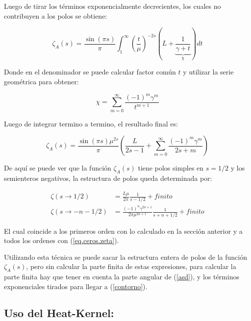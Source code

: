 	Luego de tirar los términos exponencialmente decrecientes, los cuales no contribuyen a los polos se obtiene:

\begin{equation}
	\zeta _A (s) = 
    \frac{ \sin (\pi s)}{ \pi } 
    \int _1 ^{\infty} 
    \left( \frac{t}{\mu}  \right)^{-2s}
    \left(
    	L + 
	    \underbrace
    	{
		\frac{1}{\gamma + t}   
		} _{\chi} 
	\right)
    dt 
\label{contorno}
\end{equation}

Donde en el denominador se puede calcular factor común $t$ y utilizar la serie geométrica para obtener:

\begin{equation}
    \chi =   \sum _{m=0} ^{\infty} \frac{(-1) ^{m} \gamma ^{m} }{t ^{m+1}}
\label{eq:chi}
\end{equation}

Luego de integrar termino a termino, el resultado final es:

\begin{equation}
    \zeta _A (s) = 
    \frac{ \sin(\pi s) \mu ^{2s }}{\pi } 
    \left(
    \frac{L}{2s-1} + 
    \sum _{m=0} ^{\infty}
    \frac{(-1) ^{m} \gamma ^{m} }{2s+m}
    \right)
\label{eq.zeta.com}
\end{equation}

De aquí se puede ver que la función $\zeta _A (s)$ tiene polos simples en $s=1/2$ y los semienteros negativos, la estructura de polos queda determinada por:

\begin{equation}
\begin{aligned}
\zeta(s \rightarrow 1/2) &= \frac{L \mu }{2 \pi} \frac{1}{s-1/2} + finito \\
\zeta (s \rightarrow -n - 1/2)  &= \frac{ (-1) ^n \gamma ^{2n+1}  }{2 \pi \mu ^{2n + 1}} \frac{1}{s + n + 1/2} + finito
\end{aligned}
\end{equation}


El cual coincide a los primeros orden con lo calculado en la sección anterior  y a todos los ordenes con (\ref{eq.ceros.zeta}).

 Utilizando esta técnica se puede sacar la estructura entera de polos de la función $\zeta _A (s) $, pero sin calcular la parte finita de estas expresiones, para calcular la parte finita hay que tener en cuenta la parte angular de (\ref{asd}), y los términos exponenciales tirados para llegar a (\ref{contorno}).


\subsection{Uso del Heat-Kernel:}


